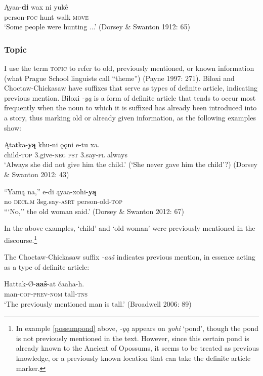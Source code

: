 \documentclass[output=paper]{LSP/langsci}
\begin{document}
\ea
\gll	Ąyaa-\textbf{di} wax ni yukê \\
	person-\textsc{foc} hunt walk \textsc{move}\\
\glt `Some people were hunting ...' (Dorsey \& Swanton 1912: 65)
\z

\subsubsection{Topic}

I use the term \textsc{topic} to refer to old, previously mentioned, or known information (what Prague School linguists call “theme”) (Payne 1997: 271). Biloxi and Choctaw-Chickasaw have suffixes that serve as types of definite article, indicating previous mention. Biloxi \emph{-yą} is a form of definite article that tends to occur most frequently when the noun to which it is suffixed has already been introduced into a story, thus marking old or already given information, as the following examples show: 

\ea
\gll	Ątatka-\textbf{yą } khu-ni 	 ǫǫni e-tu 	 xa.\\ 
child-\textsc{top} 3.give-\textsc{neg} \textsc{pst} 	 3.say-\textsc{pl} always \\
\glt `Always she did not give him the child.' (`She never gave him the child'?) (Dorsey \& Swanton 2012: 43)
\z

\ea
\gll	“Yamą na,” 	 e-di 	 ąyaa-xohi-\textbf{yą}\\
	\hspace{.6em}no 	\textsc{decl.m} 3sg.say-\textsc{asrt} person-old-\textsc{top} \\
\glt ```No,'' the old woman said.' (Dorsey \& Swanton 2012: 67)
\z

In the above examples, `child' and `old woman' were previously mentioned in the discourse.\footnote{In example \ref{possumpond} above, \emph{-yą} appears on \emph{yohi} `pond', though the pond is not previously mentioned in the text. However, since this certain pond is already known to the Ancient of Opossums, it seems to be treated as previous knowledge, or a previously known location that can take the definite article marker.}

	The Choctaw-Chickasaw suffix \emph{-aaš} indicates previous mention, in essence acting as a type of definite article:

\ea
\gll	Hattak-Ø-\textbf{aaš}-at čaaha-h.\\
	man-\textsc{cop-prev-nom} tall-\textsc{tns} \\
\glt `The previously mentioned man is tall.' 
(Broadwell 2006: 89)
\z
\end{document}
